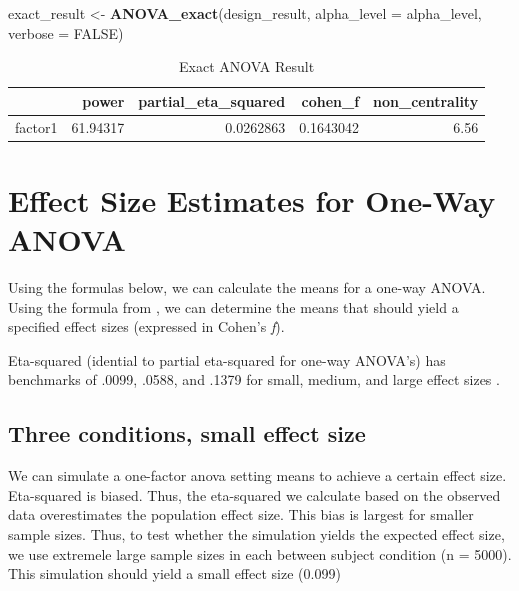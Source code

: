 \documentclass[]{book}
\newenvironment{Shaded}{\begin{snugshade}}{\end{snugshade}}
\newcommand{\DataTypeTok}[1]{\textcolor[rgb]{0.13,0.29,0.53}{#1}}
\newcommand{\KeywordTok}[1]{\textcolor[rgb]{0.13,0.29,0.53}{\textbf{#1}}}
\newcommand{\NormalTok}[1]{#1}
\newcommand{\OtherTok}[1]{\textcolor[rgb]{0.56,0.35,0.01}{#1}}
\newcommand{\StringTok}[1]{\textcolor[rgb]{0.31,0.60,0.02}{#1}}
\begin{document}
\begin{Shaded}
\begin{Highlighting}[]
\NormalTok{exact_result <-}\StringTok{ }\KeywordTok{ANOVA_exact}\NormalTok{(design_result,}
                            \DataTypeTok{alpha_level =}\NormalTok{ alpha_level,}
                            \DataTypeTok{verbose =} \OtherTok{FALSE}\NormalTok{)}
\end{Highlighting}
\end{Shaded}

\begin{table}[!h]

\caption{\label{tab:unnamed-chunk-77}Exact ANOVA Result}
\centering
\begin{tabular}{l|r|r|r|r}
\hline
  & power & partial\_eta\_squared & cohen\_f & non\_centrality\\
\hline
factor1 & 61.94317 & 0.0262863 & 0.1643042 & 6.56\\
\hline
\end{tabular}
\end{table}

\hypertarget{effect-size-estimates-for-one-way-anova}{%
\section{Effect Size Estimates for One-Way ANOVA}\label{effect-size-estimates-for-one-way-anova}}

Using the formulas below, we can calculate the means for a one-way ANOVA. Using the formula from \citet{albers2018power}, we can determine the means that should yield a specified effect sizes (expressed in Cohen's \emph{f}).

Eta-squared (idential to partial eta-squared for one-way ANOVA's) has benchmarks of .0099, .0588, and .1379 for small, medium, and large effect sizes \citep{cohen1988spa}.

\hypertarget{three-conditions-small-effect-size}{%
\subsection{Three conditions, small effect size}\label{three-conditions-small-effect-size}}

We can simulate a one-factor anova setting means to achieve a certain effect size. Eta-squared is biased. Thus, the eta-squared we calculate based on the observed data overestimates the population effect size. This bias is largest for smaller sample sizes. Thus, to test whether the simulation yields the expected effect size, we use extremele large sample sizes in each between subject condition (n = 5000). This simulation should yield a small effect size (0.099)
\end{document}

